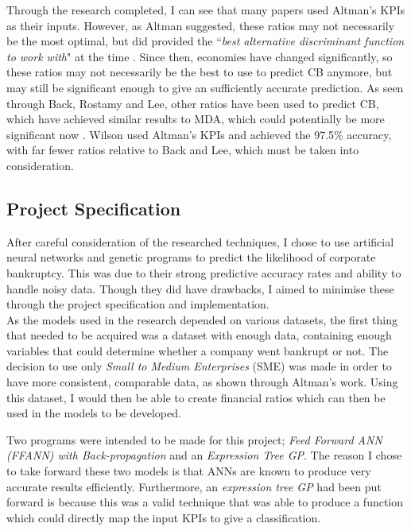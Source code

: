 \documentclass[11pt]{article}
\begin{document}
Through the research completed, I can see that many papers used Altman's KPIs as their inputs. However, as Altman suggested, these ratios may not necessarily be the most optimal, but did provided the ``\textit{best alternative discriminant function to work with}" at the time \cite{ref-six}. Since then, economies have changed significantly, so these ratios may not necessarily be the best to use to predict CB anymore, but may still be significant enough to give an sufficiently accurate prediction. As seen through Back, Rostamy and Lee, other ratios have been used to predict CB, which have achieved similar results to MDA, which could potentially be more significant now \cite{ref-thirt,ref-twelve, ref-eleven}. Wilson used Altman's KPIs and achieved the 97.5\% accuracy, with far fewer ratios relative to Back and Lee, which must be taken into consideration.
\subsection{Project Specification}\label{subsec:proj}
After careful consideration of the researched techniques, I chose to use artificial neural networks and genetic programs to predict the likelihood of corporate bankruptcy. This was due to their strong predictive accuracy rates and ability to handle noisy data. Though they did have drawbacks, I aimed to minimise these through the project specification and implementation.\\

As the models used in the research depended on various datasets, the first thing that needed to be acquired was a dataset with enough data, containing enough variables that could determine whether a company went bankrupt or not. The decision to use only \textit{Small to Medium Enterprises} (SME) was made in order to have more consistent, comparable data, as shown through Altman's work. Using this dataset, I would then be able to create financial ratios which can then be used in the models to be developed. 

Two programs were intended to be made for this project; \textit{Feed Forward ANN (FFANN) with Back-propagation} and an \textit{Expression Tree GP}.  The reason I chose to take forward these two models is that ANNs are known to produce very accurate results efficiently. Furthermore, an \textit{expression tree GP} had been put forward is because this was a valid technique that was able to produce a function which could directly map the input KPIs to give a classification.
\end{document}

